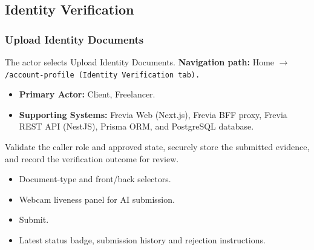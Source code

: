 

\subsection{Identity Verification}

\subsubsection{Upload Identity Documents}

The actor selects Upload Identity Documents.\newline
\textbf{Navigation path:} Home $\rightarrow$ \texttt{/\allowbreak{}account-\allowbreak{}profile (Identity Verification tab).}


\begin{itemize}[leftmargin=1.6em,topsep=3pt,itemsep=2pt,parsep=0pt,label=$\bullet$]
    \item \textbf{Primary Actor:} Client, Freelancer.
    \item \textbf{Supporting Systems:} Frevia Web (Next.js), Frevia BFF proxy, Frevia REST API (NestJS), Prisma ORM, and PostgreSQL database.
\end{itemize}

\noindent Validate the caller role and approved state, securely store the submitted evidence, and record the verification outcome for review.

\begin{itemize}[leftmargin=1.6em,topsep=3pt,itemsep=2pt,parsep=0pt,label=$\bullet$]
    \item Document-type and front/back selectors.
    \item Webcam liveness panel for AI submission.
    \item Submit.
    \item Latest status badge, submission history and rejection instructions.
\end{itemize}

